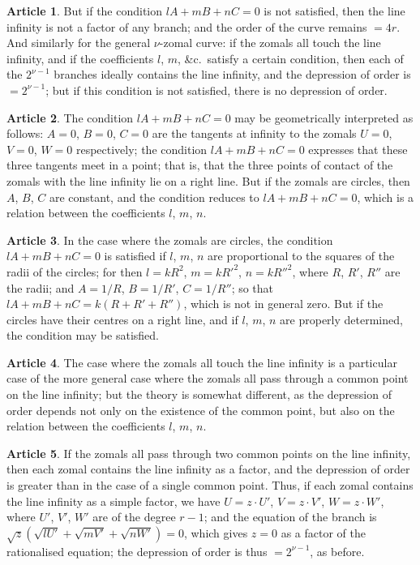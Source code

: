 \documentclass[11pt,a4paper]{article}
\theoremstyle{definition}
\newtheorem{art}{Article}
\begin{document}
\begin{art}
But if the condition $lA + mB + nC = 0$ is not satisfied, then the line infinity is not a factor of any branch; and the order of the curve remains $= 4r$. And similarly for the general $\nu$-zomal curve: if the zomals all touch the line infinity, and if the coefficients $l$, $m$, \&c.\ satisfy a certain condition, then each of the $2^{\nu-1}$ branches ideally contains the line infinity, and the depression of order is $= 2^{\nu-1}$; but if this condition is not satisfied, there is no depression of order.
\end{art}

\begin{art}
The condition $lA + mB + nC = 0$ may be geometrically interpreted as follows: $A = 0$, $B = 0$, $C = 0$ are the tangents at infinity to the zomals $U = 0$, $V = 0$, $W = 0$ respectively; the condition $lA + mB + nC = 0$ expresses that these three tangents meet in a point; that is, that the three points of contact of the zomals with the line infinity lie on a right line. But if the zomals are circles, then $A$, $B$, $C$ are constant, and the condition reduces to $lA + mB + nC = 0$, which is a relation between the coefficients $l$, $m$, $n$.
\end{art}

\begin{art}
In the case where the zomals are circles, the condition $lA + mB + nC = 0$ is satisfied if $l$, $m$, $n$ are proportional to the squares of the radii of the circles; for then $l = kR^{2}$, $m = kR'^{2}$, $n = kR''^{2}$, where $R$, $R'$, $R''$ are the radii; and $A = 1/R$, $B = 1/R'$, $C = 1/R''$; so that $lA + mB + nC = k(R + R' + R'')$, which is not in general zero. But if the circles have their centres on a right line, and if $l$, $m$, $n$ are properly determined, the condition may be satisfied.
\end{art}

\begin{art}
The case where the zomals all touch the line infinity is a particular case of the more general case where the zomals all pass through a common point on the line infinity; but the theory is somewhat different, as the depression of order depends not only on the existence of the common point, but also on the relation between the coefficients $l$, $m$, $n$.
\end{art}

\begin{art}
If the zomals all pass through two common points on the line infinity, then each zomal contains the line infinity as a factor, and the depression of order is greater than in the case of a single common point. Thus, if each zomal contains the line infinity as a simple factor, we have $U = z \cdot U'$, $V = z \cdot V'$, $W = z \cdot W'$, where $U'$, $V'$, $W'$ are of the degree $r - 1$; and the equation of the branch is $\sqrt{z}(\sqrt{lU'} + \sqrt{mV'} + \sqrt{nW'}) = 0$, which gives $z = 0$ as a factor of the rationalised equation; the depression of order is thus $= 2^{\nu-1}$, as before.
\end{art}
\end{document}
